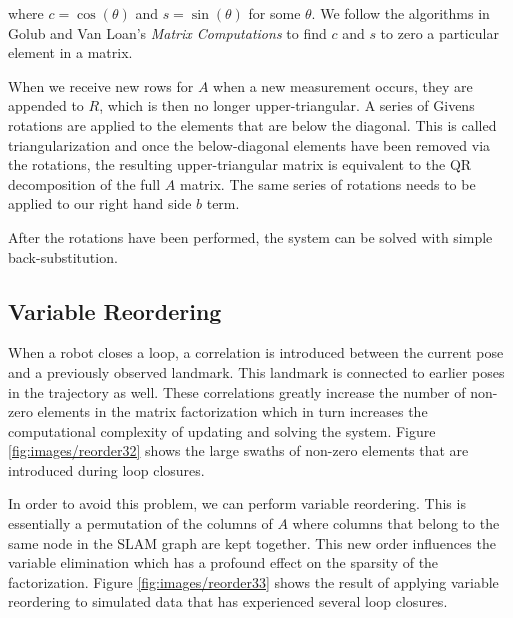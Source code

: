 \documentclass[conference]{IEEEtran}
\begin{document}
where $c = \cos{(\theta)}$ and $s = \sin{(\theta)}$ for some $\theta$. We follow the
  algorithms in Golub and Van Loan's \emph{Matrix Computations} to find $c$ and $s$ to
  zero a particular element in a matrix. \cite{golub1996matrix} 

When we receive new rows for $A$ when a new measurement occurs, they are appended to $R$,
which is then no longer upper-triangular. A series of Givens rotations are applied to the
elements that are below the diagonal. This is called triangularization and once the
below-diagonal elements have been removed via the rotations, the resulting
upper-triangular matrix is equivalent to the QR decomposition of the full $A$ matrix.
\cite{golub1996matrix} The same series of rotations needs to be applied to our right hand
side $b$ term.

After the rotations have been performed, the system can be solved with simple back-substitution.


\subsection{Variable Reordering}
\label{sub:variablereordering}

When a robot closes a loop, a correlation is introduced between the current pose and a
previously observed landmark. This landmark is connected to earlier poses in the
trajectory as well. These correlations greatly increase the number of non-zero elements in
the matrix factorization which in turn increases the computational complexity of updating
and solving the system. Figure \ref{fig:images/reorder32} shows the large swaths of
non-zero elements that are introduced during loop closures. 

In order to avoid this problem, we can perform variable reordering. This is essentially a
permutation of the columns of $A$ where columns that belong to the same node in the SLAM
graph are kept together. This new order influences the variable elimination which
has a profound effect on the sparsity of the factorization. Figure
\ref{fig:images/reorder33} shows the result of applying variable reordering to simulated
data that has experienced several loop closures.
\end{document}
